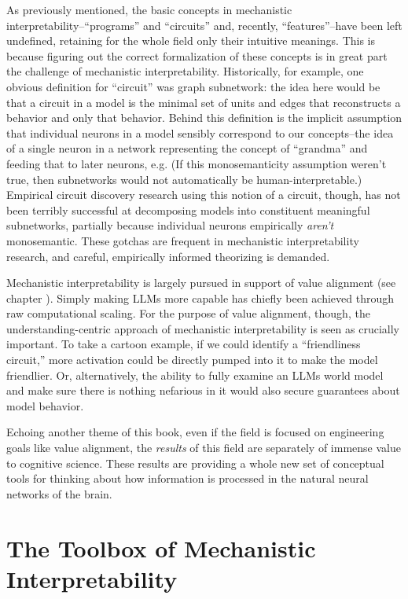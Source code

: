As previously mentioned, the basic concepts in mechanistic
interpretability--``programs'' and ``circuits'' and, recently,
``features''--have been left undefined, retaining for the whole field only
their intuitive meanings. This is because figuring out the correct
formalization of these concepts is in great part the challenge of mechanistic
interpretability. Historically, for example, one obvious definition for
``circuit'' was graph subnetwork: the idea here would be that a circuit in a
model is the minimal set of units and edges that reconstructs a behavior and
only that behavior. Behind this definition is the implicit assumption that
individual neurons in a model sensibly correspond to our concepts--the idea of
a single neuron in a network representing the concept of ``grandma'' and
feeding that to later neurons, e.g. (If this monosemanticity assumption weren't
true, then subnetworks would not automatically be human-interpretable.)
Empirical circuit discovery research using this notion of a circuit, though,
has not been terribly successful at decomposing models into constituent
meaningful subnetworks, partially because individual neurons empirically
\emph{aren't} monosemantic. These gotchas are frequent in mechanistic
interpretability research, and careful, empirically informed theorizing is
demanded.

Mechanistic interpretability is largely pursued in support of value alignment
(see chapter ). Simply making LLMs more capable has
chiefly been achieved through raw computational scaling. For the purpose of
value alignment, though, the understanding-centric approach of mechanistic
interpretability is seen as crucially important. To take a cartoon example, if
we could identify a ``friendliness circuit,'' more activation could be directly
pumped into it to make the model friendlier. Or, alternatively, the ability to
fully examine an LLMs world model and make sure there is nothing nefarious in
it would also secure guarantees about model behavior.

Echoing another theme of this book, even if the field is focused on engineering
goals like value alignment, the \emph{results} of this field are separately of
immense value to cognitive science. These results are providing a whole new set
of conceptual tools for thinking about how information is processed in the
natural neural networks of the brain.

\section{The Toolbox of Mechanistic Interpretability}


